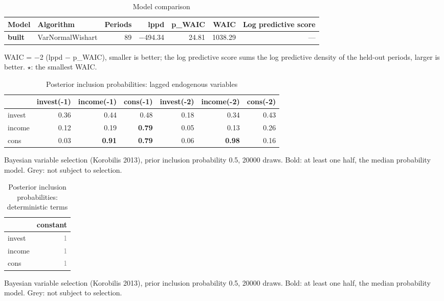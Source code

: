 \begin{table}[htbp]
  \centering
  \caption{Model comparison}
  \label{tab:model-comparison}
  \begin{tabular}{llrrrrr}
    \toprule
    Model & Algorithm & Periods & lppd & p\_WAIC & WAIC & Log predictive score \\
    \midrule
    \textbf{built} & VarNormalWishart & 89 & \ensuremath{-}494.34 & 24.81 & 1038.29 & --- \\
    \bottomrule
  \end{tabular}
  \par\medskip\footnotesize WAIC = \ensuremath{-}2 (lppd \ensuremath{-} p\_WAIC), smaller is better; the log predictive score sums the log predictive density of the held-out periods, larger is better. \ensuremath{\star}: the smallest WAIC.
\end{table}

\begin{table}[htbp]
  \centering
  \caption{Posterior inclusion probabilities: lagged endogenous variables}
  \label{tab:posterior-inclusion-probabilities-lagged}
  \begin{tabular}{lrrrrrr}
    \toprule
     & invest(-1) & income(-1) & cons(-1) & invest(-2) & income(-2) & cons(-2) \\
    \midrule
    invest & 0.36 & 0.44 & 0.48 & 0.18 & 0.34 & 0.43 \\
    income & 0.12 & 0.19 & \textbf{0.79} & 0.05 & 0.13 & 0.26 \\
    cons & 0.03 & \textbf{0.91} & \textbf{0.79} & 0.06 & \textbf{0.98} & 0.16 \\
    \bottomrule
  \end{tabular}
  \par\medskip\footnotesize Bayesian variable selection (Korobilis 2013), prior inclusion probability 0.5, 20000 draws. Bold: at least one half, the median probability model. Grey: not subject to selection.
\end{table}

\begin{table}[htbp]
  \centering
  \caption{Posterior inclusion probabilities: deterministic terms}
  \label{tab:posterior-inclusion-probabilities-determ}
  \begin{tabular}{lr}
    \toprule
     & constant \\
    \midrule
    invest & \textcolor{gray}{1} \\
    income & \textcolor{gray}{1} \\
    cons & \textcolor{gray}{1} \\
    \bottomrule
  \end{tabular}
  \par\medskip\footnotesize Bayesian variable selection (Korobilis 2013), prior inclusion probability 0.5, 20000 draws. Bold: at least one half, the median probability model. Grey: not subject to selection.
\end{table}

